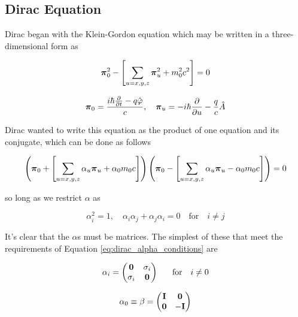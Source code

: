 \subsection{Dirac Equation}

Dirac\cite{Dirac610} began with the Klein-Gordon equation which may be written in a three-dimensional form as

\begin{equation}
\label{eq:dirac_3D}
{\bf{\pi}}_{0}^{2} - \left[\sum_{u=x,y,z}{\bf{\pi}}_{u}^{2} + m_{0}^{2}c^{2}\right] = 0
\end{equation}

\begin{equation}
\label{eq:dirac_3D_def}
{\bf{\pi}}_{0} = \frac{i\hbar\frac{\partial}{\partial t} -q\hat{\varphi}}{c}, \quad {\bf{\pi}}_{u} = -i\hbar\frac{\partial}{\partial u} - \frac{q}{c}\hat{A}
\end{equation}

Dirac wanted to write this equation as the product of one equation and its conjugate, which can be done as follows

\begin{equation}
\label{eq:dirac_3D_conj}
\left({\bf{\pi}}_{0} + \left[\sum_{u=x,y,z}\alpha_{u}{\bf{\pi}}_{u} + \alpha_{0}m_{0}c\right]\right)\left({\bf{\pi}}_{0} - \left[\sum_{u=x,y,z}\alpha_{u}{\bf{\pi}}_{u} - \alpha_{0}m_{0}c\right]\right) = 0
\end{equation}

so long as we restrict $\alpha$ as

\begin{equation}
\label{eq:dirac_alpha_conditions}
\alpha^{2}_{i} = 1, \quad \alpha_{i}\alpha_{j} + \alpha_{j}\alpha_{i} = 0 \quad \text{for} \quad i \neq j
\end{equation}

It's clear that the $\alpha$s must be matrices. The simplest of these that meet the requirements of Equation \ref{eq:dirac_alpha_conditions} are

\begin{equation}
\label{eq:dirac_alpha_matrix}
\alpha_{i} = 
\begin{pmatrix}
{\bf{0}}	&	\sigma_{i}	\\
\sigma_{i}	&	{\bf{0}}	\\
\end{pmatrix} 
\quad \text{for} \quad i \neq 0
\end{equation}

\begin{equation}
\label{eq:dirac_beta_matrix}
\alpha_{0} \equiv \beta = 
\begin{pmatrix}
{\bf{I}}	&	{\bf{0}}	\\
{\bf{0}}	&	-{\bf{I}}	\\
\end{pmatrix} 
\end{equation}

